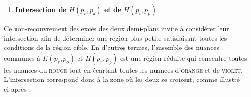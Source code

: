 \documentclass{article}
\begin{document}
\begin{enumerate}[label=\textbf{(\roman*)}]
\begin{figure}[h!]
\begin{minipage}{.48\linewidth}
\end{minipage}
\end{figure}

  \item \textbf{Intersection de $H(p_r,p_o)$ et de $H(p_r,p_p)$}
\end{enumerate}

Ce non-recouvrement des excès des deux demi-plans invite à considérer leur intersection afin de déterminer une région plus petite satisfaisant toutes les conditions de la région cible. En d’autres termes, l’ensemble des nuances communes à $H(p_r,p_o)$ et $H(p_r,p_p)$ est une région réduite qui concentre toutes les nuances du \textsc{rouge} tout en écartant toutes les nuances d’\textsc{orange} et de \textsc{violet}. L’intersection correspond donc à la zone où les deux se croisent, comme illustré ci-après :
\end{document}
